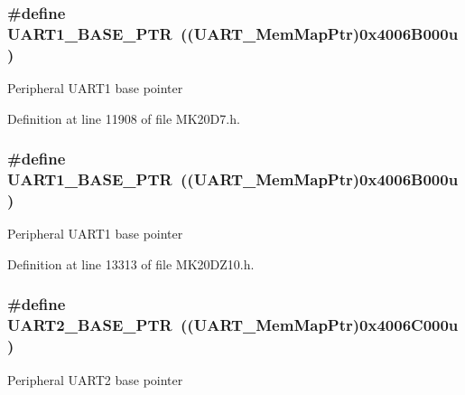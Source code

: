 \subsubsection[{\texorpdfstring{U\+A\+R\+T1\+\_\+\+B\+A\+S\+E\+\_\+\+P\+TR}{UART1_BASE_PTR}}]{\setlength{\rightskip}{0pt plus 5cm}\#define U\+A\+R\+T1\+\_\+\+B\+A\+S\+E\+\_\+\+P\+TR~(({\bf U\+A\+R\+T\+\_\+\+Mem\+Map\+Ptr})0x4006\+B000u)}\hypertarget{group___u_a_r_t___peripheral_gafb5b1236c1cdf2d9a6464251b791030c}{}\label{group___u_a_r_t___peripheral_gafb5b1236c1cdf2d9a6464251b791030c}
Peripheral U\+A\+R\+T1 base pointer 

Definition at line 11908 of file M\+K20\+D7.\+h.

\subsubsection[{\texorpdfstring{U\+A\+R\+T1\+\_\+\+B\+A\+S\+E\+\_\+\+P\+TR}{UART1_BASE_PTR}}]{\setlength{\rightskip}{0pt plus 5cm}\#define U\+A\+R\+T1\+\_\+\+B\+A\+S\+E\+\_\+\+P\+TR~(({\bf U\+A\+R\+T\+\_\+\+Mem\+Map\+Ptr})0x4006\+B000u)}\hypertarget{group___u_a_r_t___peripheral_gafb5b1236c1cdf2d9a6464251b791030c}{}\label{group___u_a_r_t___peripheral_gafb5b1236c1cdf2d9a6464251b791030c}
Peripheral U\+A\+R\+T1 base pointer 

Definition at line 13313 of file M\+K20\+D\+Z10.\+h.

\subsubsection[{\texorpdfstring{U\+A\+R\+T2\+\_\+\+B\+A\+S\+E\+\_\+\+P\+TR}{UART2_BASE_PTR}}]{\setlength{\rightskip}{0pt plus 5cm}\#define U\+A\+R\+T2\+\_\+\+B\+A\+S\+E\+\_\+\+P\+TR~(({\bf U\+A\+R\+T\+\_\+\+Mem\+Map\+Ptr})0x4006\+C000u)}\hypertarget{group___u_a_r_t___peripheral_ga75ca2ea4e490b3c1c7aa55fc9c25cd37}{}\label{group___u_a_r_t___peripheral_ga75ca2ea4e490b3c1c7aa55fc9c25cd37}
Peripheral U\+A\+R\+T2 base pointer 

